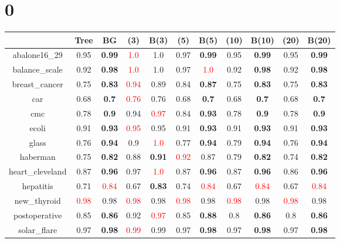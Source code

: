 \documentclass{article}%
\begin{document}
%
\normalsize%
\section*{0}%
\begin{tabular}{c|cccccccccc}%
\hline%
&Tree&BG&(3)&B(3)&(5)&B(5)&(10)&B(10)&(20)&B(20)\\%
\hline%
abalone16\_29&0.95&\textbf{0.99}&\textcolor{red}{ 
1.0
}&1.0&0.97&\textbf{0.99}&0.95&\textbf{0.99}&0.95&\textbf{0.99}\\%
\hline%
balance\_scale&0.92&\textbf{0.98}&\textcolor{red}{ 
1.0
}&1.0&0.97&\textcolor{red}{ 
1.0
}&0.92&\textbf{0.98}&0.92&\textbf{0.98}\\%
\hline%
breast\_cancer&0.75&\textbf{0.83}&\textcolor{red}{ 
0.94
}&0.89&0.84&\textbf{0.87}&0.75&\textbf{0.83}&0.75&\textbf{0.83}\\%
\hline%
car&0.68&\textbf{0.7}&\textcolor{red}{ 
0.76
}&0.76&0.68&\textbf{0.7}&0.68&\textbf{0.7}&0.68&\textbf{0.7}\\%
\hline%
cmc&0.78&\textbf{0.9}&0.94&\textcolor{red}{ 
0.97
}&0.84&\textbf{0.93}&0.78&\textbf{0.9}&0.78&\textbf{0.9}\\%
\hline%
ecoli&0.91&\textbf{0.93}&\textcolor{red}{ 
0.95
}&0.95&0.91&\textbf{0.93}&0.91&\textbf{0.93}&0.91&\textbf{0.93}\\%
\hline%
glass&0.76&\textbf{0.94}&0.9&\textcolor{red}{ 
1.0
}&0.77&\textbf{0.94}&0.79&\textbf{0.94}&0.76&\textbf{0.94}\\%
\hline%
haberman&0.75&\textbf{0.82}&0.88&\textbf{0.91}&\textcolor{red}{ 
0.92
}&0.87&0.79&\textbf{0.82}&0.74&\textbf{0.82}\\%
\hline%
heart\_cleveland&0.87&\textbf{0.96}&0.97&\textcolor{red}{ 
1.0
}&0.87&\textbf{0.96}&0.87&\textbf{0.96}&0.86&\textbf{0.96}\\%
\hline%
hepatitis&0.71&\textcolor{red}{ 
0.84
}&0.67&\textbf{0.83}&0.74&\textcolor{red}{ 
0.84
}&0.67&\textcolor{red}{ 
0.84
}&0.67&\textcolor{red}{ 
0.84
}\\%
\hline%
new\_thyroid&\textcolor{red}{ 
0.98
}&0.98&\textcolor{red}{ 
0.98
}&0.98&\textcolor{red}{ 
0.98
}&0.98&\textcolor{red}{ 
0.98
}&0.98&\textcolor{red}{ 
0.98
}&0.98\\%
\hline%
postoperative&0.85&\textbf{0.86}&0.92&\textcolor{red}{ 
0.97
}&0.85&\textbf{0.88}&0.8&\textbf{0.86}&0.8&\textbf{0.86}\\%
\hline%
solar\_flare&0.97&\textbf{0.98}&\textcolor{red}{ 
0.99
}&0.99&0.97&\textbf{0.98}&0.97&\textbf{0.98}&0.97&\textbf{0.98}\\%

\end{tabular}
\end{document}
